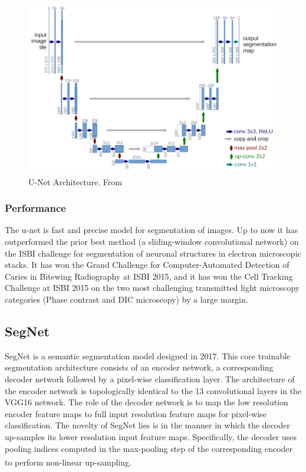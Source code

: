 \begin{figure}[H]
\centering
\includegraphics[width=\columnwidth]{../images/u-net-architecture.png}
\caption{U-Net Architecture. From \textsuperscript{\cite{ronneberger2015u}}}
\label{fig:CNN}
\end{figure}

\subsubsection{Performance}
\hspace{\parindent}
The u-net is fast and precise model for segmentation of images. Up to now it has outperformed the prior best method (a sliding-window convolutional network) on the ISBI challenge for segmentation of neuronal structures in electron microscopic stacks. It has won the Grand Challenge for Computer-Automated Detection of Caries in Bitewing Radiography at ISBI 2015, and it has won the Cell Tracking Challenge at ISBI 2015 on the two most challenging transmitted light microscopy categories (Phase contrast and DIC microscopy) by a large margin.

\subsection{SegNet}
\hspace{\parindent}
SegNet is a semantic segmentation model designed in 2017. This core trainable segmentation architecture consists of an encoder network, a corresponding decoder network followed by a pixel-wise classification layer. The architecture of the encoder network is topologically identical to the 13 convolutional layers in the VGG16 network. The role of the decoder network is to map the low resolution encoder feature maps to full input resolution feature maps for pixel-wise classification. The novelty of SegNet lies is in the manner in which the decoder up-samples its lower resolution input feature maps. Specifically, the decoder uses pooling indices computed in the max-pooling step of the corresponding encoder to perform non-linear up-sampling. \textsuperscript{\cite{badrinarayanan2017segnet}}

